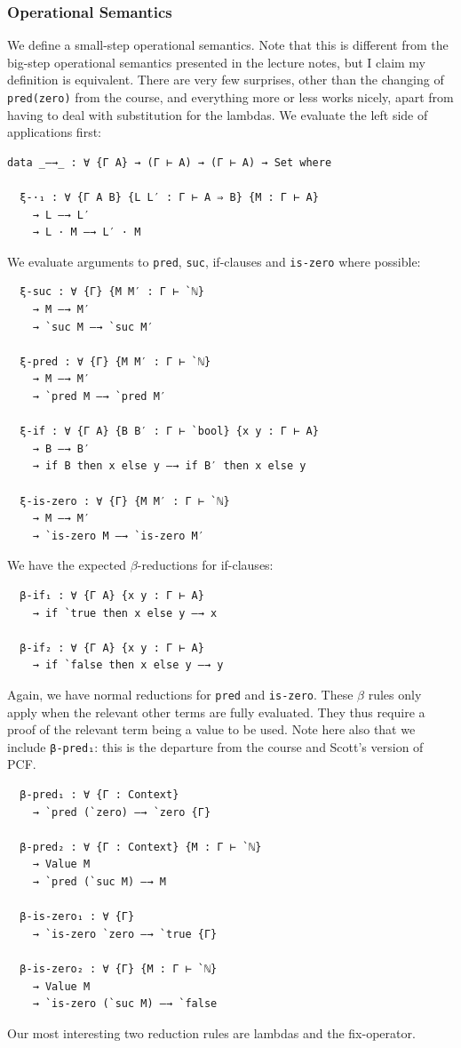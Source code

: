 \documentclass[12pt,a4paper,twoside,openright]{report}
\begin{document}
\subsubsection{Operational Semantics}
We define a small-step operational semantics. Note that this is different from the big-step operational semantics presented in the lecture notes, but I claim my definition is equivalent. There are very few surprises, other than the changing of \texttt{pred(zero)} from the course, and everything more or less works nicely, apart from having to deal with substitution for the lambdas.
We evaluate the left side of applications first:
\begin{verbatim}
data _—→_ : ∀ {Γ A} → (Γ ⊢ A) → (Γ ⊢ A) → Set where

  ξ-·₁ : ∀ {Γ A B} {L L′ : Γ ⊢ A ⇒ B} {M : Γ ⊢ A}
    → L —→ L′
    → L · M —→ L′ · M
\end{verbatim}
We evaluate arguments to \texttt{pred}, \texttt{suc}, if-clauses and \texttt{is-zero} where possible:
\begin{verbatim}
  ξ-suc : ∀ {Γ} {M M′ : Γ ⊢ `ℕ}
    → M —→ M′
    → `suc M —→ `suc M′

  ξ-pred : ∀ {Γ} {M M′ : Γ ⊢ `ℕ}
    → M —→ M′
    → `pred M —→ `pred M′
  
  ξ-if : ∀ {Γ A} {B B′ : Γ ⊢ `bool} {x y : Γ ⊢ A}
    → B —→ B′
    → if B then x else y —→ if B′ then x else y

  ξ-is-zero : ∀ {Γ} {M M′ : Γ ⊢ `ℕ}
    → M —→ M′
    → `is-zero M —→ `is-zero M′
\end{verbatim}
We have the expected $\beta$-reductions for if-clauses:
\begin{verbatim}
  β-if₁ : ∀ {Γ A} {x y : Γ ⊢ A}
    → if `true then x else y —→ x

  β-if₂ : ∀ {Γ A} {x y : Γ ⊢ A}
    → if `false then x else y —→ y
\end{verbatim}
Again, we have normal reductions for \texttt{pred} and \texttt{is-zero}. These $\beta$ rules only apply when the relevant other terms are fully evaluated. They thus require a proof of the relevant term being a value to be used. Note here also that we include \texttt{β-pred₁}: this is the departure from the course and Scott's version of PCF. 
\begin{verbatim}
  β-pred₁ : ∀ {Γ : Context}
    → `pred (`zero) —→ `zero {Γ}

  β-pred₂ : ∀ {Γ : Context} {M : Γ ⊢ `ℕ}
    → Value M
    → `pred (`suc M) —→ M

  β-is-zero₁ : ∀ {Γ}
    → `is-zero `zero —→ `true {Γ}

  β-is-zero₂ : ∀ {Γ} {M : Γ ⊢ `ℕ}
    → Value M
    → `is-zero (`suc M) —→ `false 
\end{verbatim}
Our most interesting two reduction rules are lambdas and the fix-operator. 
\end{document}
